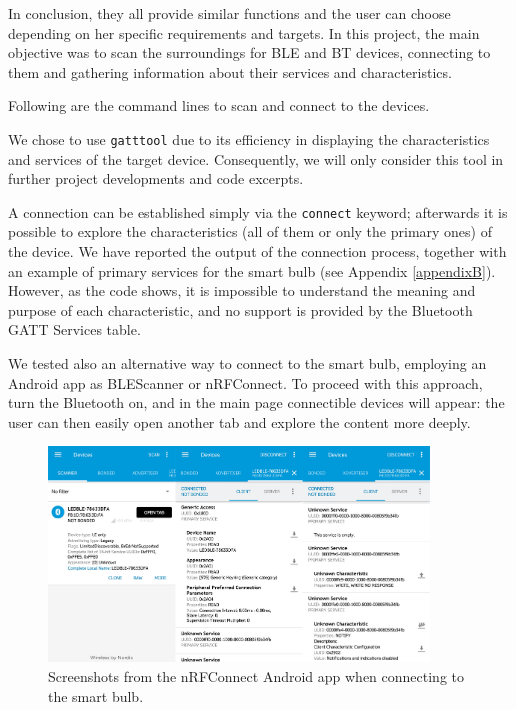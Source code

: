 In conclusion, they all provide similar functions and the user can choose depending on her specific requirements and targets. In this project, the main objective was to scan the surroundings for BLE and BT devices, connecting to them and gathering information about their services and characteristics.

Following are the command lines to scan and connect to the devices.




We chose to use \texttt{gatttool} due to its efficiency in displaying the characteristics and services of the target device. Consequently, we will only consider this tool in further project developments and code excerpts.

A connection can be established simply via the \texttt{connect} keyword; afterwards it is possible to explore the characteristics (all of them or only the primary ones) of the device. We have reported the output of the connection process, together with an example of primary services for the smart bulb (see Appendix \ref{appendixB}). However, as the code shows, it is impossible to understand the meaning and purpose of each characteristic, and no support is provided by the Bluetooth GATT Services table.

We tested also an alternative way to connect to the smart bulb, employing an Android app as BLEScanner or nRFConnect. To proceed with this approach, turn the Bluetooth on, and in the main page connectible devices will appear: the user can then easily open another tab and explore the content more deeply.

\begin{figure}
	\centering
		\includegraphics[width=0.9\textwidth]{nrfConnect.jpg}
		\caption{Screenshots from the nRFConnect Android app when connecting to the smart bulb.}
	\label{fig:nrfConnect}
\end{figure}	


